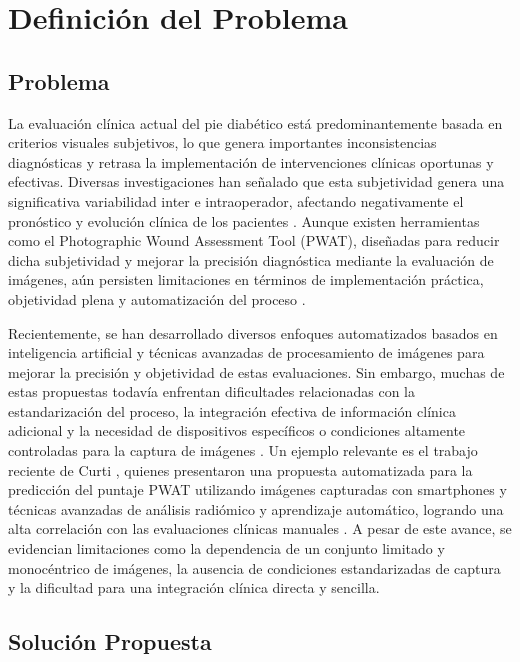 \usetikzlibrary{arrows,positioning}
\section{Definición del Problema}
\subsection{Problema}
\label{ssec:P}

La evaluación clínica actual del pie diabético está predominantemente basada en criterios visuales subjetivos, lo que genera importantes inconsistencias diagnósticas y retrasa la implementación de intervenciones clínicas oportunas y efectivas. Diversas investigaciones han señalado que esta subjetividad genera una significativa variabilidad inter e intraoperador, afectando negativamente el pronóstico y evolución clínica de los pacientes \cite{mishra2017diabetic, bandyk2018diabetic, thompson2013reliability}. Aunque existen herramientas como el Photographic Wound Assessment Tool (PWAT), diseñadas para reducir dicha subjetividad y mejorar la precisión diagnóstica mediante la evaluación de imágenes, aún persisten limitaciones en términos de implementación práctica, objetividad plena y automatización del proceso \cite{thompson2013reliability, organizacion2016informe}.

Recientemente, se han desarrollado diversos enfoques automatizados basados en inteligencia artificial y técnicas avanzadas de procesamiento de imágenes para mejorar la precisión y objetividad de estas evaluaciones. Sin embargo, muchas de estas propuestas todavía enfrentan dificultades relacionadas con la estandarización del proceso, la integración efectiva de información clínica adicional y la necesidad de dispositivos específicos o condiciones altamente controladas para la captura de imágenes \cite{van2017computational}. Un ejemplo relevante es el trabajo reciente de Curti \cite{Curti2024}, quienes presentaron una propuesta automatizada para la predicción del puntaje PWAT utilizando imágenes capturadas con smartphones y técnicas avanzadas de análisis radiómico y aprendizaje automático, logrando una alta correlación con las evaluaciones clínicas manuales \cite{Curti2024}. A pesar de este avance, se evidencian limitaciones como la dependencia de un conjunto limitado y monocéntrico de imágenes, la ausencia de condiciones estandarizadas de captura y la dificultad para una integración clínica directa y sencilla.

\subsection{Solución Propuesta}
\label{ssec:SP}

